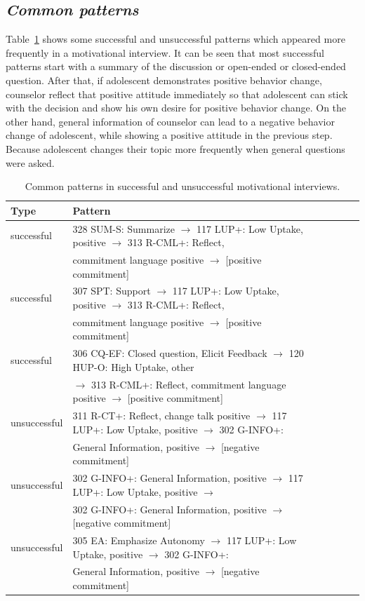 \documentclass{amia}
\begin{document}
\subsection*{\textit{Common patterns}}
Table~\ref{tab:common_patterns} shows some successful and unsuccessful patterns which appeared more frequently in a motivational interview. It can be seen that most successful patterns start with a summary of the discussion or open-ended or closed-ended question. After that, if adolescent demonstrates positive behavior change, counselor reflect that positive attitude immediately so that adolescent can stick with the decision and show his own desire for positive behavior change. On the other hand, general information of counselor can lead to a negative behavior change of adolescent, while showing a positive attitude in the previous step. Because adolescent changes their topic more frequently when general questions were asked.   

\begin{table}[h]
\centering
\caption{Common patterns in successful and unsuccessful motivational interviews.}
\label{tab:common_patterns}
  \begin{tabular}{|l|l|l|l|l|l|}
  \hline
   \textbf{Type} & \textbf{Pattern} \\ \hline      
successful & 328 SUM-S: Summarize $\rightarrow $ 117 LUP+: Low Uptake, positive $\rightarrow $ 313 R-CML+: Reflect, \\ 
& commitment language positive $\rightarrow $ [positive commitment] \\\hline
successful & 307 SPT: Support $\rightarrow $ 117 LUP+: Low Uptake, positive $\rightarrow $ 313 R-CML+: Reflect, \\
& commitment language positive $\rightarrow $ [positive commitment] \\\hline
successful & 306 CQ-EF: Closed question, Elicit Feedback $\rightarrow $ 120 HUP-O: High Uptake, other \\
& $\rightarrow $ 313 R-CML+: Reflect, commitment language positive $\rightarrow $ [positive commitment] \\\hline
unsuccessful & 311 R-CT+: Reflect, change talk positive $\rightarrow $ 117 LUP+: Low Uptake, positive $\rightarrow $ 302 G-INFO+:  \\
& General Information, positive $\rightarrow $ [negative commitment] \\\hline
unsuccessful & 302 G-INFO+: General Information, positive $\rightarrow $ 117 LUP+: Low Uptake, positive $\rightarrow $  \\
& 302 G-INFO+: General Information, positive $\rightarrow $ [negative commitment] \\\hline
unsuccessful & 305 EA: Emphasize Autonomy $\rightarrow $ 117 LUP+: Low Uptake, positive $\rightarrow $ 302 G-INFO+:  \\
& General Information, positive $\rightarrow $ [negative commitment] \\\hline
  \end{tabular}
\end{table} 
\end{document}
